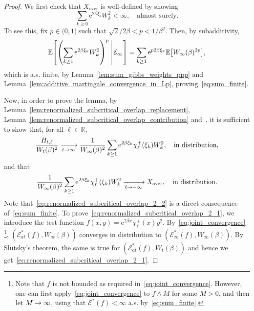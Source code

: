 \documentclass[10pt]{amsart}
\theoremstyle{definition}\newtheorem{defi}[theo]{Definition}\newtheorem{rema}[theo]{Remark}\newtheorem{exam}[theo]{Example}\newtheorem{exem}[theo]{Example}\newtheorem{nota}[theo]{Notation}
\newcommand{\rover}{\mathrm{over}}
\newcommand{\e}{\mathrm{e}}
\newcommand{\E}{\mathbb{E}}
\newcommand{\R}{\mathbb{R}}
\newcommand\1{\mathds{1}}
\newcommand{\cE}{\mathcal{E}}
\newcommand{\Expec}[1]{\mathbb{E}\left[#1\right]}
\let\originalleft\left
\let\originalright\right
\renewcommand{\left}{\mathopen{}\mathclose\bgroup\originalleft}
\renewcommand{\right}{\aftergroup\egroup\originalright}
\renewcommand*{\to}{\mathchoice{\longrightarrow}{\rightarrow}{\rightarrow}{\rightarrow}}
\begin{document}
\begin{proof}
We first check that $X_{\rover}$ is well-defined by showing
\begin{equation}\label{eq:sum_finite}
\sum_{k \geq 0} \e^{2 \beta \xi_k} W_k^2 < \infty,
\quad \text{almost surely}.
\end{equation}
To see this, fix $p \in (0,1]$ such that $\sqrt{2}/2\beta < p < 1/\beta^2$. Then, by subadditivity,
\begin{equation*}
\E \left[\left(\sum_{k \geq 1} \e^{2 \beta \xi_k} W_k^2\right)^p \,\middle|\, \cE_\infty \right] = \sum_{k \geq 1} \e^{p2 \beta \xi_k} \Expec{W_\infty(\beta)^{2p}},
\end{equation*}
which is a.s. finite, by Lemma~\ref{lem:sum_gibbs_weights_ppp} and Lemma~\ref{lem:additive_martingale_convergence_in_Lp}, proving~\eqref{eq:sum_finite}.

Now, in order to prove the lemma, by Lemma~\ref{lem:renormalized_subcritical_overlap_replacement}, Lemma~\ref{lem:renormalized_subcritical_overlap_contribution} and~\cite[Theorem~3.2]{Billingsley1999}, it is sufficient to show that, for all $\ell \in \R$,
\begin{equation}\label{eq:renormalized_subcritical_overlap_2_1}
\frac{H_{t, \ell}}{W_t(\beta)^2} \xrightarrow[t \to \infty]{} \frac{1}{W_\infty(\beta)^2} \sum_{k \geq 1} \e^{2 \beta \xi_k} \chi_\ell^+(\xi_k) W_k^2, \quad \text{in distribution},
\end{equation}
and that
\begin{equation}\label{eq:renormalized_subcritical_overlap_2_2}
\frac{1}{W_\infty(\beta)^2} \sum_{k \geq 1} \e^{2 \beta \xi_k} \chi_\ell^+(\xi_k) W_k^2 \xrightarrow[\ell \to -\infty]{} X_{\rover}, \quad \text{in distribution}.
\end{equation}
Note that~\eqref{eq:renormalized_subcritical_overlap_2_2} is a direct consequence of~\eqref{eq:sum_finite}. To prove~\eqref{eq:renormalized_subcritical_overlap_2_1}, we introduce the test function $f(x,y) = \e^{2\beta x} \chi_\ell^+(x) y^2$. By~\eqref{eq:joint_convergence}
\footnote{Note that $f$ is not bounded as required in~\eqref{eq:joint_convergence}. However, one can first apply~\eqref{eq:joint_convergence} to $f \wedge M$ for some $M> 0$, and then let $M \to \infty$, using that $\cE^*(f) < \infty$ a.s. by~\eqref{eq:sum_finite}.}, $(\cE_{at}^*(f), W_{at}(\beta))$ converges in distribution to $(\cE_\infty^*(f), W_\infty(\beta))$. By Slutsky's theorem, the same is true for $(\cE_{at}^*(f), W_t(\beta))$ and hence we get~\eqref{eq:renormalized_subcritical_overlap_2_1}.
\end{proof}
\end{document}
